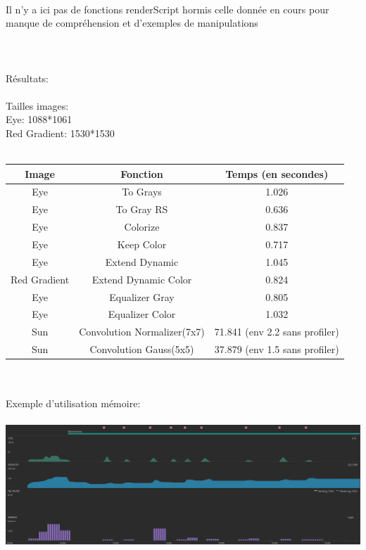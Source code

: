 \documentclass[12pt]{article}
\begin{document}
\\
Il n'y a ici pas de fonctions renderScript hormis celle donnée en cours pour manque de compréhension et d'exemples de manipulations\\
\\
\\
\\
Résultats:\\
\\
Tailles images:\\
Eye: 1088*1061\\
Red Gradient: 1530*1530\\
\\
\begin{tabular}{| c | c | c |}
    \hline
    Image & Fonction & Temps (en secondes)\\ \hline
    Eye & To Grays & 1.026 \\ \hline
    Eye & To Gray RS & 0.636 \\ \hline
    Eye & Colorize & 0.837 \\ \hline
    Eye & Keep Color & 0.717 \\ \hline
    Eye & Extend Dynamic & 1.045 \\ \hline
    Red Gradient & Extend Dynamic Color & 0.824 \\ \hline
    Eye & Equalizer Gray & 0.805 \\ \hline
    Eye & Equalizer Color & 1.032 \\ \hline
    Sun & Convolution Normalizer(7x7) & 71.841 (env 2.2 sans profiler) \\ \hline
    Sun & Convolution Gauss(5x5) & 37.879 (env 1.5 sans profiler) \\ \hline
\end{tabular}
\\
\\
Exemple d'utilisation mémoire:\\
\\
\includegraphics{./ProfilerImg.PNG}
\end{document}

